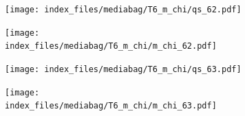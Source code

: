 \documentclass[
  11pt,
  letterpaper,
]{scrreprt}
\begin{document}
\begin{figure}

\begin{minipage}{0.50\linewidth}

\begin{figure}[H]

{\centering \texttt{[image: index\_files/mediabag/T6\_m\_chi/qs\_62.pdf]}

}


\end{figure}%

\end{minipage}%
%
\begin{minipage}{0.50\linewidth}

\begin{figure}[H]

{\centering \texttt{[image: index\_files/mediabag/T6\_m\_chi/m\_chi\_62.pdf]}

}


\end{figure}%

\end{minipage}%

\end{figure}%

\begin{figure}

\begin{minipage}{0.50\linewidth}

\begin{figure}[H]

{\centering \texttt{[image: index\_files/mediabag/T6\_m\_chi/qs\_63.pdf]}

}


\end{figure}%

\end{minipage}%
%
\begin{minipage}{0.50\linewidth}

\begin{figure}[H]

{\centering \texttt{[image: index\_files/mediabag/T6\_m\_chi/m\_chi\_63.pdf]}

}


\end{figure}%

\end{minipage}%

\end{figure}%
\end{document}
